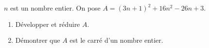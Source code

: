 
$n$ est un nombre entier. On pose $A=(3n+1)^2+16n^2-26n+3$.
\begin{enumerate}
\item Développer et réduire $A$.
\item Démontrer que $A$ est le carré d'un nombre entier.
\end{enumerate}
